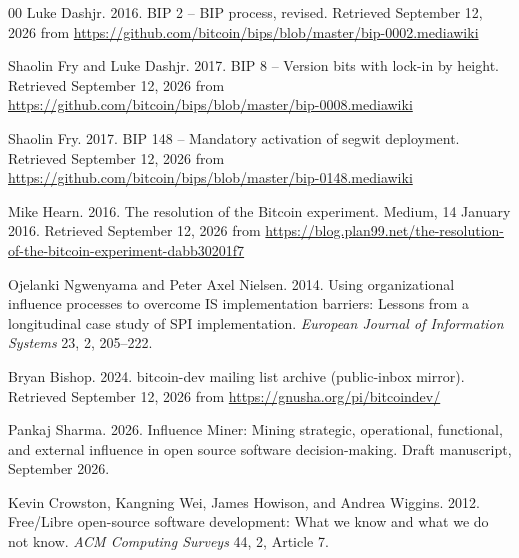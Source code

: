 \documentclass[sigconf,screen]{acmart}
\begin{document}
\begin{thebibliography}{00}
Luke Dashjr. 2016. BIP 2 -- BIP process, revised. Retrieved September 12, 2026 from \url{https://github.com/bitcoin/bips/blob/master/bip-0002.mediawiki}

Shaolin Fry and Luke Dashjr. 2017. BIP 8 -- Version bits with lock-in by height. Retrieved September 12, 2026 from \url{https://github.com/bitcoin/bips/blob/master/bip-0008.mediawiki}

Shaolin Fry. 2017. BIP 148 -- Mandatory activation of segwit deployment. Retrieved September 12, 2026 from \url{https://github.com/bitcoin/bips/blob/master/bip-0148.mediawiki}

Mike Hearn. 2016. The resolution of the Bitcoin experiment. Medium, 14 January 2016. Retrieved September 12, 2026 from \url{https://blog.plan99.net/the-resolution-of-the-bitcoin-experiment-dabb30201f7}

Ojelanki Ngwenyama and Peter Axel Nielsen. 2014. Using organizational influence processes to overcome IS implementation barriers: Lessons from a longitudinal case study of SPI implementation. \emph{European Journal of Information Systems} 23, 2, 205--222.

Bryan Bishop. 2024. bitcoin-dev mailing list archive (public-inbox mirror). Retrieved September 12, 2026 from \url{https://gnusha.org/pi/bitcoindev/}

Pankaj Sharma. 2026. Influence Miner: Mining strategic, operational, functional, and external influence in open source software decision-making. Draft manuscript, September 2026.

Kevin Crowston, Kangning Wei, James Howison, and Andrea Wiggins. 2012. Free/Libre open-source software development: What we know and what we do not know. \emph{ACM Computing Surveys} 44, 2, Article 7.

\end{thebibliography}
\end{document}
